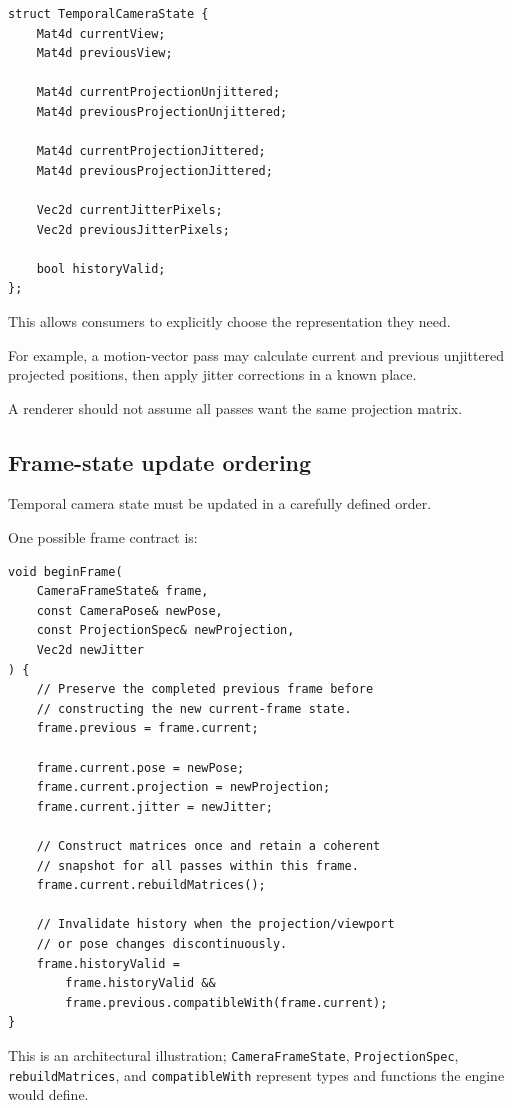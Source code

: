 \begin{verbatim}
struct TemporalCameraState {
    Mat4d currentView;
    Mat4d previousView;

    Mat4d currentProjectionUnjittered;
    Mat4d previousProjectionUnjittered;

    Mat4d currentProjectionJittered;
    Mat4d previousProjectionJittered;

    Vec2d currentJitterPixels;
    Vec2d previousJitterPixels;

    bool historyValid;
};
\end{verbatim}

This allows consumers to explicitly choose the representation they need.

For example, a motion-vector pass may calculate current and previous unjittered projected positions, then apply jitter corrections in a known place.

A renderer should not assume all passes want the same projection matrix.

\subsection{Frame-state update ordering}\label{02-foundations-ii-ch037-frame-state-update-ordering}

Temporal camera state must be updated in a carefully defined order.

One possible frame contract is:

\begin{verbatim}
void beginFrame(
    CameraFrameState& frame,
    const CameraPose& newPose,
    const ProjectionSpec& newProjection,
    Vec2d newJitter
) {
    // Preserve the completed previous frame before
    // constructing the new current-frame state.
    frame.previous = frame.current;

    frame.current.pose = newPose;
    frame.current.projection = newProjection;
    frame.current.jitter = newJitter;

    // Construct matrices once and retain a coherent
    // snapshot for all passes within this frame.
    frame.current.rebuildMatrices();

    // Invalidate history when the projection/viewport
    // or pose changes discontinuously.
    frame.historyValid =
        frame.historyValid &&
        frame.previous.compatibleWith(frame.current);
}
\end{verbatim}

This is an architectural illustration; \texttt{CameraFrameState}, \texttt{ProjectionSpec}, \texttt{rebuildMatrices}, and \texttt{compatibleWith} represent types and functions the engine would define.

